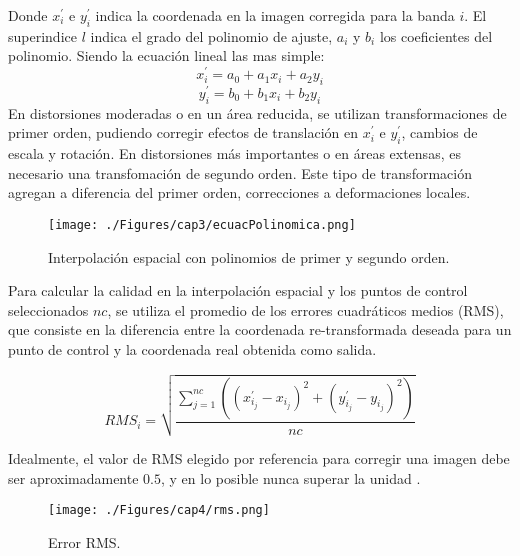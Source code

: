 

Donde $ x^{'}_{i} $ e $ y^{'}_{i} $ indica la coordenada en la imagen corregida para la banda $ i $. El superindice $ l $ indica el grado del polinomio de ajuste, $ a_{i} $ y $ b_{i} $ los coeficientes del polinomio. Siendo la ecuaci\'on lineal las mas simple:
	\begin{equation}
	x^{'}_{i} = a_{0}+a_{1}x_{i}+a_{2}y_{i}
	\end{equation} 
		\begin{equation}
		y^{'}_{i} = b_{0}+b_{1}x_{i}+b_{2}y_{i}
		\end{equation} 
En distorsiones moderadas o en un \'area reducida, se utilizan transformaciones de primer orden, pudiendo corregir efectos de translaci\'on en $ x^{'}_{i} $ e $ y^{'}_{i} $, cambios de escala y rotaci\'on.
En distorsiones m\'as importantes o en \'areas extensas, es necesario una transfomaci\'on de segundo orden. Este tipo de transformaci\'on agregan a diferencia del primer orden, correcciones a deformaciones locales.
    \begin{figure}[H]
    	\centering
    	\texttt{[image: ./Figures/cap3/ecuacPolinomica.png]}
    	\caption{Interpolaci\'on espacial con polinomios de primer y segundo orden.}
    	\label{fig:intPolEcua}
    \end{figure}
 Para calcular la calidad en la interpolaci\'on espacial y los puntos de control seleccionados $ nc $, se utiliza el promedio de los errores cuadráticos medios (RMS), que consiste en la diferencia entre la coordenada re-transformada deseada para un punto de control y la coordenada real obtenida como salida.

 \begin{equation}
 RMS_{i} = \sqrt{\dfrac{\sum_{j=1}^{nc} ((x_{i_{j}}^{'}-x_{i_{j}})^{2}+(y_{i_{j}}^{'}-y_{i_{j}})^{2})}{nc}}
 \end{equation} 

 	Idealmente, el valor de RMS elegido por referencia para corregir una imagen debe ser aproximadamente $ 0.5 $, y en lo posible nunca superar la unidad \cite{guide1999erdas}.
 
 
     \begin{figure}[H]
     	\centering
     	\texttt{[image: ./Figures/cap4/rms.png]}
     	\caption{Error RMS.}
     	\label{fig:rms}
     \end{figure}



